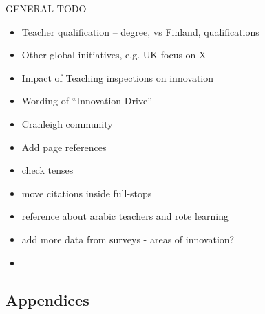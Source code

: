 GENERAL TODO
\begin{itemize}
\item Teacher qualification – degree, vs Finland, qualifications
\item Other global initiatives, e.g. UK focus on X
\item Impact of Teaching inspections on innovation
\item Wording of “Innovation Drive”
\item Cranleigh community
\item Add page references
\item check tenses
\item move citations inside full-stops
\item reference about arabic teachers and rote learning
\item add more data from surveys - areas of innovation?
\item \cite{Cordingley2007}
\end{itemize}

\subsection{Appendices}

